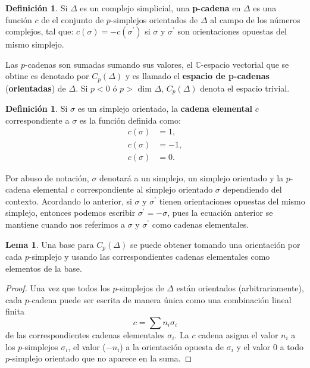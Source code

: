 \documentclass[12pt]{book}
\theoremstyle{definition}
\newtheorem{definition}[theorem]{Definición}
\newtheorem{lemma}[theorem]{Lema}
\newcounter{in}
\newcounter{ini}
\begin{document}
\begin{definition}
  \label{p_chain}
  Si $\Delta$ es un complejo simplicial, una \textbf{p-cadena} en
  $\Delta$ es una función $c$ de el conjunto de $p$-simplejos
  orientados de $\Delta$ al campo de los números complejos, tal que:
  $c(\sigma) = -c(\sigma^{'})$ si $\sigma$ y $\sigma^{'}$ son orientaciones
  opuestas del mismo simplejo.
\end{definition}
Las $p$-cadenas son sumadas sumando sus valores, el $\mathbb{C}$-espacio
vectorial que  se obtine es denotado por $C_{p}(\Delta)$ y es llamado el
\textbf{espacio de p-cadenas} (\textbf{orientadas}) de $\Delta$. Si
$p < 0$ ó $p > $ dim $\Delta$, $C_{p}(\Delta)$ denota el espacio
trivial.
\begin{definition}
  \label{elementary_chain}
  Si $\sigma$ es un simplejo orientado, la \textbf{cadena elemental}
  $c$ correspondiente a $\sigma$ es la función definida como:
  \begin{equation}
    \label{eq:80}
     \begin{aligned}
    c(\sigma) &= 1,\\
    c(\sigma) &= -1, \\
    c(\sigma) &= 0.
  \end{aligned}
  \end{equation}
\end{definition}
Por abuso de notación, $\sigma$ denotará a un simplejo, un simplejo
orientado y la $p$-cadena elemental $c$ correspondiente al simplejo
orientado $\sigma$ dependiendo del contexto.  Acordando lo anterior,
si $\sigma$ y $\sigma^{'}$ tienen orientaciones opuestas del mismo
simplejo, entonces podemos escribir $\sigma^{'} = -\sigma$, pues la ecuación anterior
se mantiene cuando nos referimos a $\sigma$ y $\sigma^{'}$
como cadenas elementales.

\begin{lemma}
  \label{c_basis}
  Una base para $C_{p}(\Delta)$ se puede obtener tomando una
  orientación por cada $p$-simplejo y usando las correspondientes
  cadenas elementales como elementos de la base.
\end{lemma}

\begin{proof}
  Una vez que todos los $p$-simplejos de $\Delta$ están orientados
  (arbitrariamente), cada $p$-cadena puede ser escrita de manera única
  como una combinación lineal finita
\begin{equation}
  \label{eq:81}
  c = \sum n_{i}\sigma_{i}
\end{equation}
de las correspondientes cadenas elementales $\sigma_{i}$. La $c$ cadena
asigna el valor $n_{i}$ a los $p$-simplejos $\sigma_{i}$, el valor
($-n_{i}$) a la orientación opuesta de $\sigma_{i}$ y el valor $0$ a
todo $p$-simplejo orientado que no aparece en la suma.
\end{proof}
\end{document}
